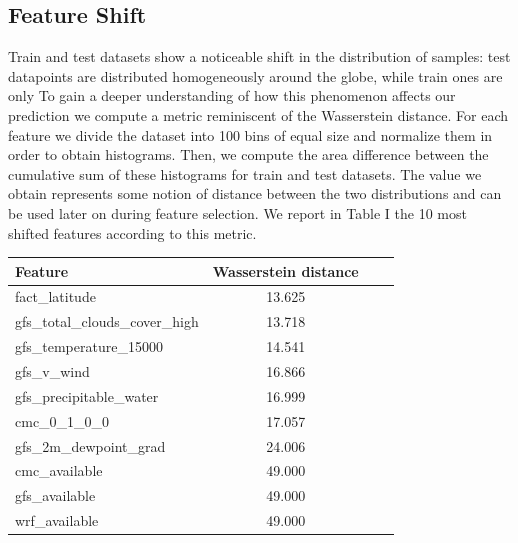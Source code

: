 \documentclass[letterpaper, 10 pt, conference]{ieeeconf}
\begin{document}
    
    \subsection{Feature Shift}
    Train and test datasets show a noticeable shift in the distribution of samples: test datapoints are distributed homogeneously around the globe, while train ones are only 
    To gain a deeper understanding of how this phenomenon affects our prediction we compute a metric reminiscent of the Wasserstein distance. For each feature we divide the dataset into 100 bins of equal size and normalize them in order to obtain histograms. Then, we compute the area difference between the cumulative sum of these histograms for train and test datasets. The value we obtain represents some notion of distance between the two distributions and can be used later on during feature selection. We report in Table I the 10 most shifted features according to this metric. 
\setlength{\tabcolsep}{2em}
\begin{table}
\begin{center}
\begin{tabular}{lccl}
\toprule
Feature                         & Wasserstein distance \\ \midrule
fact\_latitude                  & 13.625               \\
gfs\_total\_clouds\_cover\_high & 13.718               \\
gfs\_temperature\_15000         & 14.541               \\
gfs\_v\_wind                    & 16.866               \\
gfs\_precipitable\_water        & 16.999               \\
cmc\_0\_1\_0\_0                 & 17.057               \\
gfs\_2m\_dewpoint\_grad         & 24.006               \\
cmc\_available                  & 49.000               \\
gfs\_available                  & 49.000               \\
wrf\_available                  & 49.000               \\ \bottomrule
\end{tabular}
\end{center}
\end{table}
\end{document}
